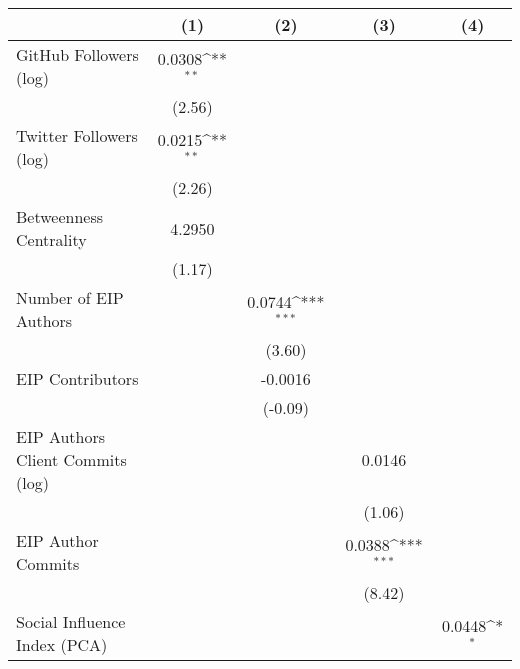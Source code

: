 {
\def\sym#1{\ifmmode^{#1}\else\(^{#1}\)\fi}
\begin{tabular}{l*{4}{c}}
\hline\hline
                                   &\multicolumn{1}{c}{(1)}         &\multicolumn{1}{c}{(2)}         &\multicolumn{1}{c}{(3)}         &\multicolumn{1}{c}{(4)}         \\
\hline
GitHub Followers (log)             &    0.0308\sym{**} &                   &                   &                   \\
                                   &    (2.56)         &                   &                   &                   \\
[1em]
Twitter Followers (log)            &    0.0215\sym{**} &                   &                   &                   \\
                                   &    (2.26)         &                   &                   &                   \\
[1em]
Betweenness Centrality             &    4.2950         &                   &                   &                   \\
                                   &    (1.17)         &                   &                   &                   \\
[1em]
Number of EIP Authors              &                   &    0.0744\sym{***}&                   &                   \\
                                   &                   &    (3.60)         &                   &                   \\
[1em]
EIP Contributors                   &                   &   -0.0016         &                   &                   \\
                                   &                   &   (-0.09)         &                   &                   \\
[1em]
EIP Authors Client Commits (log)   &                   &                   &    0.0146         &                   \\
                                   &                   &                   &    (1.06)         &                   \\
[1em]
EIP Author Commits                 &                   &                   &    0.0388\sym{***}&                   \\
                                   &                   &                   &    (8.42)         &                   \\
[1em]
Social Influence Index (PCA)       &                   &                   &                   &    0.0448\sym{*}  \\

\end{tabular}}
